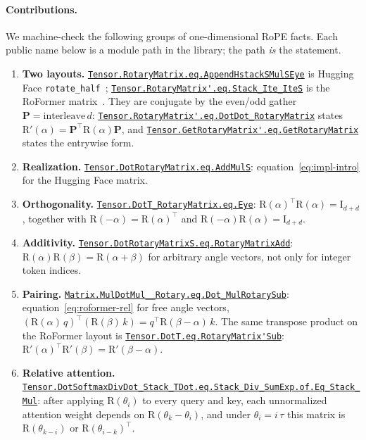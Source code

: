 \documentclass[11pt,a4paper]{article}
\newcommand{\lmod}[1]{\href{http://www.lemma.cn/lean/?module=#1}{\nolinkurl{#1}}}
\newcommand{\rot}{\mathrm{R}}
\newcommand{\eye}{\mathrm{I}}
\begin{document}
\paragraph{Contributions.}
We machine-check the following groups of one-dimensional RoPE facts.
Each public name below is a module path in the library; the path \emph{is} the statement.

\begin{enumerate}[leftmargin=1.6em,itemsep=0.4em]
  \item \textbf{Two layouts.}
    \lmod{Tensor.RotaryMatrix.eq.AppendHstackSMulSEye}
    is Hugging Face \texttt{rotate\_half}~\cite{huggingface_rope_utils};
    \lmod{Tensor.RotaryMatrix'.eq.Stack_Ite_IteS}
    is the RoFormer matrix~\cite{su2021roformer}.
    They are conjugate by the even/odd gather \(\boldsymbol{P}=\mathrm{interleave}\,d\):
    \lmod{Tensor.RotaryMatrix'.eq.DotDot_RotaryMatrix}
    states \(\rot'(\alpha)=\boldsymbol{P}^\top\rot(\alpha)\boldsymbol{P}\),
    and
    \lmod{Tensor.GetRotaryMatrix'.eq.GetRotaryMatrix}
    states the entrywise form.
  \item \textbf{Realization.}
    \lmod{Tensor.DotRotaryMatrix.eq.AddMulS}:
    equation~\eqref{eq:impl-intro} for the Hugging Face matrix.
  \item \textbf{Orthogonality.}
    \lmod{Tensor.DotT_RotaryMatrix.eq.Eye}:
    \(\rot(\alpha)^\top\rot(\alpha)=\eye_{d+d}\),
    together with \(\rot(-\alpha)=\rot(\alpha)^\top\) and \(\rot(-\alpha)\rot(\alpha)=\eye_{d+d}\).
  \item \textbf{Additivity.}
    \lmod{Tensor.DotRotaryMatrixS.eq.RotaryMatrixAdd}:
    \(\rot(\alpha)\rot(\beta)=\rot(\alpha+\beta)\)
    for arbitrary angle vectors, not only for integer token indices.
  \item \textbf{Pairing.}
    \lmod{Matrix.MulDotMul__Rotary.eq.Dot_MulRotarySub}:
    equation~\eqref{eq:roformer-rel} for free angle vectors,
    \((\rot(\alpha)\,q)^\top(\rot(\beta)\,k)=q^\top\rot(\beta-\alpha)\,k\).
    The same transpose product on the RoFormer layout is
    \lmod{Tensor.DotT.eq.RotaryMatrix'Sub}:
    \(\rot'(\alpha)^\top\rot'(\beta)=\rot'(\beta-\alpha)\).
  \item \textbf{Relative attention.}
    \lmod{Tensor.DotSoftmaxDivDot_Stack_TDot.eq.Stack_Div_SumExp.of.Eq_Stack_Mul}:
    after applying \(\rot(\theta_i)\) to every query and key,
    each unnormalized attention weight depends on \(\rot(\theta_k-\theta_i)\),
    and under \(\theta_i=i\,\tau\) this matrix is
    \(\rot(\theta_{k-i})\) or \(\rot(\theta_{i-k})^\top\).
\end{enumerate}
\end{document}
